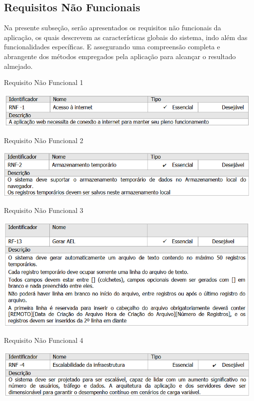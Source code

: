 \subsection{Requisitos Não Funcionais}
Na presente subseção, serão apresentados os requisitos não funcionais da aplicação, os quais descrevem as características globais do sistema, indo além das funcionalidades específicas.
E assegurando uma compreensão completa e abrangente dos métodos empregados pela aplicação para alcançar o resultado almejado.

\begin{table}[H]
    \caption{Requisito Não Funcional 1}\label{tab:rnf1}
    \centering
    \includegraphics[scale=0.82]{imagens/rnf1.png}
\end{table}
\begin{table}[H]
    \caption{Requisito Não Funcional 2}\label{tab:rnf2}
    \centering
    \includegraphics[scale=0.82]{imagens/rnf2.png}
\end{table}
\begin{table}[H]
    \caption{Requisito Não Funcional 3}\label{tab:rnf3}
    \centering
    \includegraphics[scale=0.82]{imagens/rnf3.png}
\end{table}
\begin{table}[H]
    \caption{Requisito Não Funcional 4}\label{tab:rnf4}
    \centering
    \includegraphics[scale=0.82]{imagens/rnf4.png}
\end{table}
